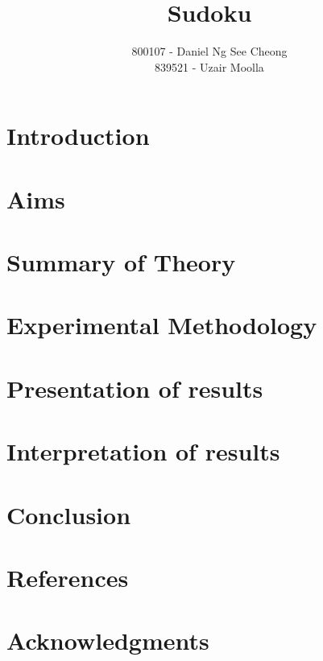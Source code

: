 \documentclass[12pt,a4paper,titlepage]{article}
\author{800107 - Daniel Ng See Cheong\\
		839521 - Uzair Moolla}
\title{Sudoku}
\begin{document}
\maketitle

\section{Introduction}

\section{Aims}

\section{Summary of Theory}

\section{Experimental Methodology}

\section{Presentation of results}

\section{Interpretation of results}

\section{Conclusion}

\section{References}

\section{Acknowledgments}
\end{document}
